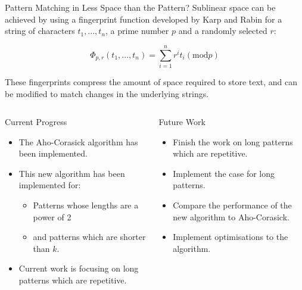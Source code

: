 \documentclass[ %
                    author={Dominic Moylett},
                    degree={MEng},
                     title={Dictionary Matching with Fingerprints},
                  subtitle={},
                      type={Research},
                      year={2015} ]{poster}
\begin{document}
\begin{frame}{}
\begin{columns}[t]
  \begin{column}{0.422\linewidth}
  \begin{block}{\Large Pattern Matching in Less Space than the Pattern?}
  Sublinear space can be achieved by using a fingerprint function developed by Karp and Rabin for a string of characters $t_1,...,t_n$, a prime number $p$ and a randomly selected $r$:

  $$\Phi_{p, r}(t_1,...,t_n) = \sum_{i = 1}^{n}r^it_i (\text{mod} p)$$

  These fingerprints compress the amount of space required to store text, and can be modified to match changes in the underlying strings.
  \end{block}
  \end{column}
\end{columns}

\vfill

\begin{columns}[t]
  \begin{column}{0.422\linewidth}
  \begin{block}{\Large Current Progress}
  \begin{itemize}
  \item The Aho-Corasick algorithm has been implemented.
  \item This new algorithm has been implemented for:
    \begin{itemize}
    \item Patterns whose lengths are a power of 2
    \item and patterns which are shorter than $k$.
    \end{itemize}
  \item Current work is focusing on long patterns which are repetitive.
  \end{itemize}
  \end{block}
  \end{column}
  \begin{column}{0.422\linewidth}
  \begin{block}{\Large Future Work}
  \begin{itemize}
  \item Finish the work on long patterns which are repetitive.
  \item Implement the case for long patterns.
  \item Compare the performance of the new algorithm to Aho-Corasick.
  \item Implement optimisations to the algorithm.
  \end{itemize}
  \end{block}
  \end{column}
\end{columns}

\vfill

\end{frame}

\end{document}
